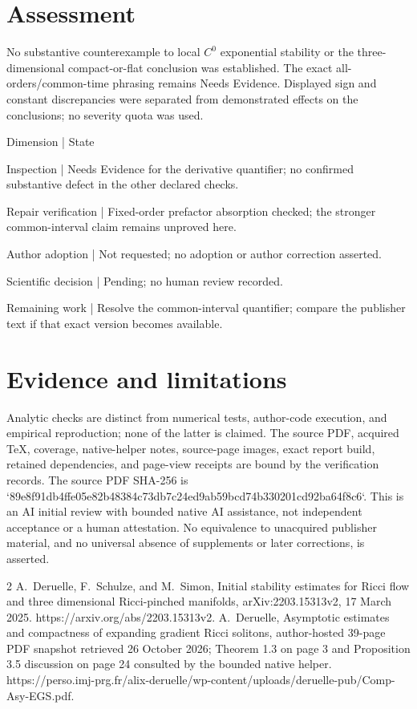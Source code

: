 \documentclass[10pt]{article}
\begin{document}
\section*{Assessment}
No substantive counterexample to local \(C^0\) exponential stability or the three-dimensional compact-or-flat conclusion was established. The exact all-orders/common-time phrasing remains Needs Evidence. Displayed sign and constant discrepancies were separated from demonstrated effects on the conclusions; no severity quota was used.\par
Dimension | State\par
Inspection | Needs Evidence for the derivative quantifier; no confirmed substantive defect in the other declared checks.\par
Repair verification | Fixed-order prefactor absorption checked; the stronger common-interval claim remains unproved here.\par
Author adoption | Not requested; no adoption or author correction asserted.\par
Scientific decision | Pending; no human review recorded.\par
Remaining work | Resolve the common-interval quantifier; compare the publisher text if that exact version becomes available.\par
\section*{Evidence and limitations}
Analytic checks are distinct from numerical tests, author-code execution, and empirical reproduction; none of the latter is claimed. The source PDF, acquired TeX, coverage, native-helper notes, source-page images, exact report build, retained dependencies, and page-view receipts are bound by the verification records. The source PDF SHA-256 is `89e8f91db4ffe05e82b48384c73db7c24ed9ab59bcd74b330201cd92ba64f8c6`. This is an AI initial review with bounded native AI assistance, not independent acceptance or a human attestation. No equivalence to unacquired publisher material, and no universal absence of supplements or later corrections, is asserted.\par
2 A. Deruelle, F. Schulze, and M. Simon, Initial stability estimates for Ricci flow and three dimensional Ricci-pinched manifolds, arXiv:2203.15313v2, 17 March 2025. https://arxiv.org/abs/2203.15313v2. A. Deruelle, Asymptotic estimates and compactness of expanding gradient Ricci solitons, author-hosted 39-page PDF snapshot retrieved 26 October 2026; Theorem 1.3 on page 3 and Proposition 3.5 discussion on page 24 consulted by the bounded native helper. https://perso.imj-prg.fr/alix-deruelle/wp-content/uploads/deruelle-pub/Comp-Asy-EGS.pdf.\par
\end{document}
